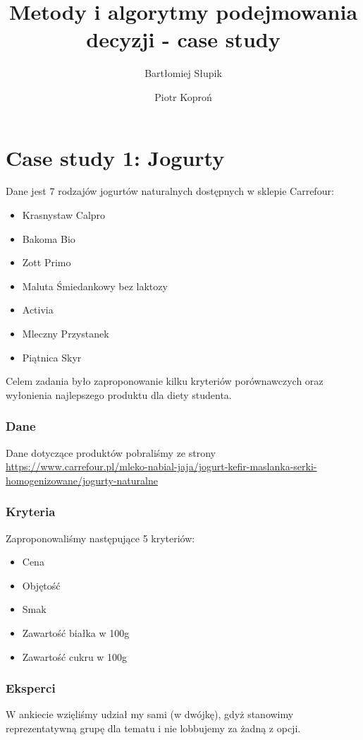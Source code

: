 \documentclass[12pt, a4paper]{article}
\title{Metody i algorytmy podejmowania decyzji - case study}
\author{Bartłomiej Słupik \and Piotr Koproń}
\begin{document}
    \maketitle
    \section*{Case study 1: Jogurty}
    Dane jest 7 rodzajów jogurtów naturalnych dostępnych w sklepie Carrefour:
    \begin{itemize}
        \item Krasnystaw Calpro
        \item Bakoma Bio 
        \item Zott Primo
        \item Maluta Śmiedankowy bez laktozy
        \item Activia
        \item Mleczny Przystanek
        \item Piątnica Skyr
    \end{itemize}

    Celem zadania było zaproponowanie kilku kryteriów porównawczych oraz wyłonienia najlepszego produktu
    dla diety studenta.

    \subsubsection*{Dane}
    Dane dotyczące produktów pobraliśmy ze strony \\ \href{https://www.carrefour.pl/mleko-nabial-jaja/jogurt-kefir-maslanka-serki-homogenizowane/jogurty-naturalne}{https://www.carrefour.pl/mleko-nabial-jaja/jogurt-kefir-maslanka-serki-homogenizowane/jogurty-naturalne}
    

    \subsubsection*{Kryteria}
    Zaproponowaliśmy następujące 5 kryteriów:
    \begin{itemize}
        \item Cena
        \item Objętość
        \item Smak
        \item Zawartość białka w 100g
        \item Zawartość cukru w 100g
    \end{itemize}

    \subsubsection*{Eksperci}
    W ankiecie wzięliśmy udział my sami (w dwójkę), gdyż stanowimy reprezentatywną grupę dla tematu i nie lobbujemy za żadną z opcji.
\end{document}
